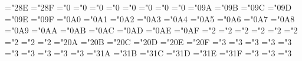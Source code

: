 { \def\bmrbrack{\delimiter"5\mtbmi@@8D\mtbex@@03 }%
 \mathchardef\bmdagger="2\mtbmi@@8E
 \mathchardef\bmddagger="2\mtbmi@@8F
 \mathchardef\bmupalpha="0
 \mathchardef\bmupbeta="0
 \mathchardef\bmupgamma="0
 \mathchardef\bmupdelta="0
 \mathchardef\bmupepsilon="0
 \mathchardef\bmupzeta="0
 \mathchardef\bmupeta="0
 \mathchardef\bmuptheta="0
 \mathchardef\bmupiota="0\mtbmi@@9A
 \mathchardef\bmupkappa="0\mtbmi@@9B
 \mathchardef\bmuplambda="0\mtbmi@@9C
 \mathchardef\bmupmu="0\mtbmi@@9D
 \mathchardef\bmupnu="0\mtbmi@@9E
 \mathchardef\bmupxi="0\mtbmi@@9F
 \mathchardef\bmuppi="0\mtbmi@@ A0
 \mathchardef\bmuprho="0\mtbmi@@ A1
 \mathchardef\bmupsigma="0\mtbmi@@ A2
 \mathchardef\bmuptau="0\mtbmi@@ A3
 \mathchardef\bmupupsilon="0\mtbmi@@ A4
 \mathchardef\bmupphi="0\mtbmi@@ A5
 \mathchardef\bmupchi="0\mtbmi@@ A6
 \mathchardef\bmuppsi="0\mtbmi@@ A7
 \mathchardef\bmupomega="0\mtbmi@@ A8
 \mathchardef\bmupvarepsilon="0\mtbmi@@ A9
 \mathchardef\bmupvartheta="0\mtbmi@@ AA
 \mathchardef\bmupvarpi="0\mtbmi@@ AB
 \mathchardef\bmupvarrho="0\mtbmi@@ AC
 \mathchardef\bmupvarsigma="0\mtbmi@@ AD
 \mathchardef\bmupvarphi="0\mtbmi@@ AE
 \mathchardef\bmupvarkappa="0\mtbmi@@ AF
 \mathchardef\bmcdot="2
 \mathchardef\bmtimes="2
 \mathchardef\bmast="2
 \mathchardef\bmdiv="2
 \mathchardef\bmdiamond="2
 \mathchardef\bmpm="2
 \mathchardef\bmmp="2
 \mathchardef\bmoplus="2
 \mathchardef\bmominus="2
 \mathchardef\bmotimes="2\mtbsy@@0A
 \mathchardef\bmoslash="2\mtbsy@@0B
 \mathchardef\bmodot="2\mtbsy@@0C
 \mathchardef\bmbigcirc="2\mtbsy@@0D
 \mathchardef\bmcirc="2\mtbsy@@0E
 \mathchardef\bmbullet="2\mtbsy@@0F
 \mathchardef\bmasymp="3
 \mathchardef\bmequiv="3
 \mathchardef\bmsubseteq="3
 \mathchardef\bmsupseteq="3
 \mathchardef\bmleq="3 \let\bmle=\bmleq
 \mathchardef\bmgeq="3 \let\bmge=\bmgeq
 \mathchardef\bmpreceq="3
 \mathchardef\bmsucceq="3
 \mathchardef\bmsim="3
 \mathchardef\bmapprox="3
 \mathchardef\bmsubset="3\mtbsy@@1A
 \mathchardef\bmsupset="3\mtbsy@@1B
 \mathchardef\bmll="3\mtbsy@@1C
 \mathchardef\bmgg="3\mtbsy@@1D
 \mathchardef\bmprec="3\mtbsy@@1E
 \mathchardef\bmsucc="3\mtbsy@@1F
 \mathchardef\bmleftarrow="3 \let\bmgets=\bmleftarrow
 \mathchardef\bmrightarrow="3 \let\bmto=\bmrightarrow
 \def\bmuparrow{\delimiter"3\mtbsyt@@22\mtbex@@78 }%
 \def\bmdownarrow{\delimiter"3\mtbsyt@@23\mtbex@@79 }%
 \mathchardef\bmleftrightarrow="3
}
